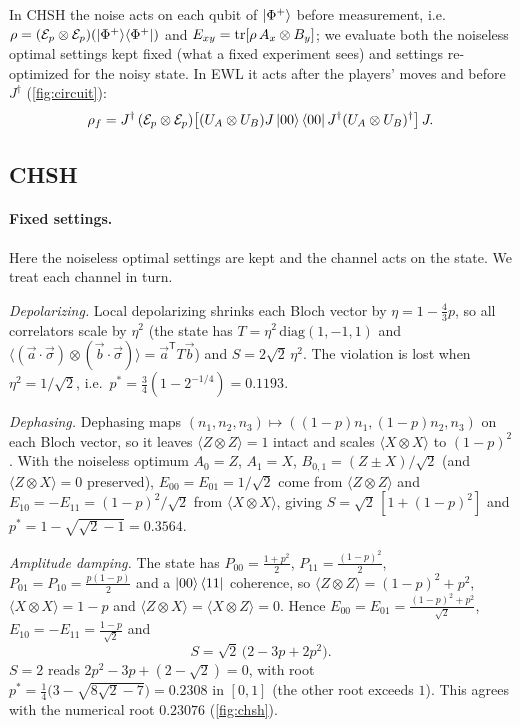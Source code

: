 \documentclass[11pt,a4paper]{article}
\begin{document}
\begingroup\sloppy In CHSH the noise acts on each qubit of $\ket{\Phi^+}$ before measurement, i.e.\ $\rho=(\mathcal E_p\otimes\mathcal E_p)(\ket{\Phi^+}\!\bra{\Phi^+})$ and
$E_{xy}=\tr[\rho\,A_x\otimes B_y]$; we evaluate both the noiseless optimal settings kept fixed (what a fixed experiment sees) and settings re-optimized for the noisy state. In EWL it acts after the players' moves and before $J^\dagger$ (\cref{fig:circuit}):
\[
\rho_f=J^\dagger\,(\mathcal E_p\otimes\mathcal E_p)\big[(U_A\otimes U_B)J\ket{00}\bra{00}J^\dagger(U_A\otimes U_B)^\dagger\big]\,J .
\]\endgroup

\subsection{CHSH}\label{sec:chsh-noise}
\paragraph{Fixed settings.} Here the noiseless optimal settings are kept and the channel acts on the state. We treat each channel in turn.

\emph{Depolarizing.} Local depolarizing shrinks each Bloch vector by $\eta=1-\tfrac43p$, so all correlators scale by $\eta^2$ (the state has $T=\eta^2\,\mathrm{diag}(1,-1,1)$ and $\langle(\vec a\cdot\vec\sigma)\otimes(\vec b\cdot\vec\sigma)\rangle=\vec a^{\mathsf T}T\vec b$) and $S=2\sqrt2\,\eta^2$. The violation is lost when $\eta^2=1/\sqrt2$, i.e.\ $p^*=\tfrac34(1-2^{-1/4})=0.1193$.

\emph{Dephasing.} Dephasing maps $(n_1,n_2,n_3)\mapsto((1-p)n_1,(1-p)n_2,n_3)$ on each Bloch vector, so it leaves $\langle Z\otimes Z\rangle=1$ intact and scales $\langle X\otimes X\rangle$ to $(1-p)^2$. With the noiseless optimum $A_0=Z$, $A_1=X$, $B_{0,1}=(Z\pm X)/\sqrt2$ (and $\langle Z\otimes X\rangle=0$ preserved), $E_{00}=E_{01}=1/\sqrt2$ come from $\langle Z\otimes Z\rangle$ and $E_{10}=-E_{11}=(1-p)^2/\sqrt2$ from $\langle X\otimes X\rangle$, giving $S=\sqrt2\,[1+(1-p)^2]$ and $p^*=1-\sqrt{\sqrt2-1}=0.3564$.

\emph{Amplitude damping.} The state has $P_{00}=\frac{1+p^2}{2}$, $P_{11}=\frac{(1-p)^2}{2}$, $P_{01}=P_{10}=\frac{p(1-p)}{2}$ and a $\ket{00}\bra{11}$ coherence, so $\langle Z\otimes Z\rangle=(1-p)^2+p^2$, $\langle X\otimes X\rangle=1-p$ and $\langle Z\otimes X\rangle=\langle X\otimes Z\rangle=0$. Hence $E_{00}=E_{01}=\frac{(1-p)^2+p^2}{\sqrt2}$, $E_{10}=-E_{11}=\frac{1-p}{\sqrt2}$ and
\[S=\sqrt2\,\big(2-3p+2p^2\big).\]
$S=2$ reads $2p^2-3p+(2-\sqrt2)=0$, with root $p^*=\tfrac14\big(3-\sqrt{8\sqrt2-7}\big)=0.2308$ in $[0,1]$ (the other root exceeds $1$). This agrees with the numerical root $0.23076$ (\cref{fig:chsh}).
\end{document}
